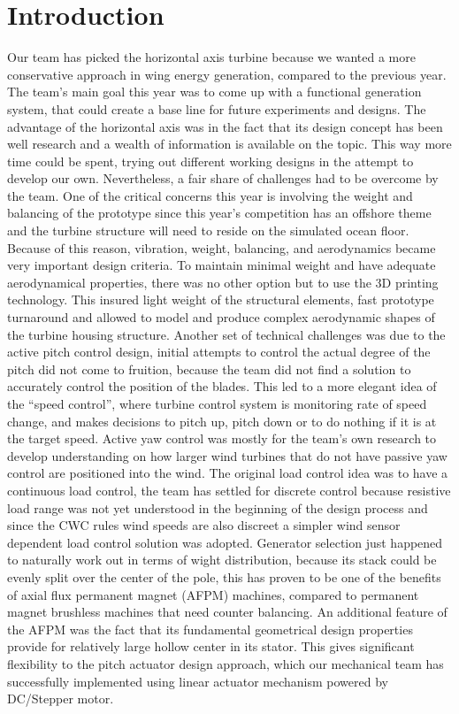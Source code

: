 \documentclass[../ewet_cwc_report.tex]{subfiles}
\begin{document}
\section{Introduction}

\noindent
Our team has picked the horizontal axis turbine because we
wanted a more conservative approach in wing energy generation,
compared to the previous year. The team's main goal this year
was to come up with a functional generation system, that could
create a base line for future experiments and designs. The
advantage of the horizontal axis was in the fact that its
design concept has been well research and a wealth of
information is available on the topic. This way more time
could be spent, trying out different working designs in the
attempt to develop our own. Nevertheless, a fair share of
challenges had to be overcome by the team. One of the
critical concerns this year is involving the weight and
balancing of the prototype since this year's competition has an
offshore theme and the turbine structure will need to reside on
the simulated ocean floor. Because of this reason, vibration,
weight, balancing, and aerodynamics became very important design
criteria. To maintain minimal weight and have adequate
aerodynamical properties, there was no other option but to use
the 3D printing technology. This insured light weight of the
structural elements, fast prototype turnaround and allowed to
model and produce complex aerodynamic shapes of the turbine
housing structure. Another set of technical challenges was due
to the active pitch control design, initial attempts to control
the actual degree of the pitch did not come to fruition,
because the team did not find a solution to accurately control
the position of the blades. This led to a more elegant idea of
the ``speed control'', where turbine control system is
monitoring rate of speed change, and makes decisions to pitch
up, pitch down or to do nothing if it is at the target speed.
Active yaw control was mostly for the team's own research to
develop understanding on how larger wind turbines that do not
have passive yaw control are positioned into the wind. The
original load control idea was to have a continuous load
control, the team has settled for discrete control because
resistive load range was not yet understood in the beginning of
the design process and since the CWC rules wind speeds are also
discreet a simpler wind sensor dependent load control solution
was adopted. Generator selection just happened to naturally
work out in terms of wight distribution, because its stack
could be evenly split over the center of the pole, this has
proven to be one of the benefits of axial flux permanent
magnet (AFPM) machines, compared to permanent magnet
brushless machines that need counter balancing.  An additional
feature of the AFPM was the fact that its fundamental
geometrical design properties provide for relatively large
hollow center in its stator. This gives significant flexibility
to the pitch actuator design approach, which our mechanical
team has successfully implemented using linear actuator
mechanism powered by DC/Stepper motor.
\end{document}
